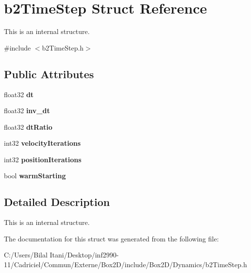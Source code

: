\hypertarget{structb2_time_step}{}\section{b2\+Time\+Step Struct Reference}
\label{structb2_time_step}


This is an internal structure.  




{\ttfamily \#include $<$b2\+Time\+Step.\+h$>$}

\subsection*{Public Attributes}
\begin{DoxyCompactItemize}
\item 
float32 {\bfseries dt}\hypertarget{structb2_time_step_a74e20836809accba98a4445fbcb3427c}{}\label{structb2_time_step_a74e20836809accba98a4445fbcb3427c}

\item 
float32 {\bfseries inv\+\_\+dt}\hypertarget{structb2_time_step_ac2d652bde6d303149db9d0a461bc22ba}{}\label{structb2_time_step_ac2d652bde6d303149db9d0a461bc22ba}

\item 
float32 {\bfseries dt\+Ratio}\hypertarget{structb2_time_step_aa67bc8a12ffafce918d9e6a0d8d3f203}{}\label{structb2_time_step_aa67bc8a12ffafce918d9e6a0d8d3f203}

\item 
int32 {\bfseries velocity\+Iterations}\hypertarget{structb2_time_step_a9f2a0ccd8029681f254003b66f201ce1}{}\label{structb2_time_step_a9f2a0ccd8029681f254003b66f201ce1}

\item 
int32 {\bfseries position\+Iterations}\hypertarget{structb2_time_step_ab7938eec17a1a3d7961d8364e150f1be}{}\label{structb2_time_step_ab7938eec17a1a3d7961d8364e150f1be}

\item 
bool {\bfseries warm\+Starting}\hypertarget{structb2_time_step_add80f7f86c84f005ad817f0313df3f32}{}\label{structb2_time_step_add80f7f86c84f005ad817f0313df3f32}

\end{DoxyCompactItemize}


\subsection{Detailed Description}
This is an internal structure. 

The documentation for this struct was generated from the following file\+:\begin{DoxyCompactItemize}
\item 
C\+:/\+Users/\+Bilal Itani/\+Desktop/inf2990-\/11/\+Cadriciel/\+Commun/\+Externe/\+Box2\+D/include/\+Box2\+D/\+Dynamics/b2\+Time\+Step.\+h\end{DoxyCompactItemize}
